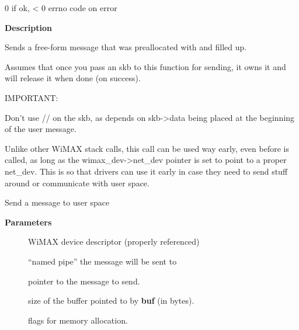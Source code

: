 \documentclass[a4paper,8pt,english]{sphinxmanual}
\begin{document}
0 if ok, \textless{} 0 errno code on error

\textbf{Description}

Sends a free-form message that was preallocated with
{\hyperref[networking/kapi:c.wimax_msg_alloc]{\emph{}}} and filled up.

Assumes that once you pass an skb to this function for sending, it
owns it and will release it when done (on success).

IMPORTANT:

Don't use {\hyperref[networking/kapi:c.skb_push]{\emph{}}}/{\hyperref[networking/kapi:c.skb_pull]{\emph{}}}/{\hyperref[networking/kapi:c.skb_reserve]{\emph{}}} on the skb, as
{\hyperref[networking/kapi:c.wimax_msg_send]{\emph{}}} depends on skb-\textgreater{}data being placed at the
beginning of the user message.

Unlike other WiMAX stack calls, this call can be used way early,
even before {\hyperref[networking/kapi:c.wimax_dev_add]{\emph{}}} is called, as long as the
wimax\_dev-\textgreater{}net\_dev pointer is set to point to a proper
net\_dev. This is so that drivers can use it early in case they need
to send stuff around or communicate with user space.

\begin{fulllineitems}
\label{networking/kapi:c.wimax_msg}
Send a message to user space

\end{fulllineitems}


\textbf{Parameters}
\begin{description}
\item[{}] \leavevmode
WiMAX device descriptor (properly referenced)

\item[{}] \leavevmode
``named pipe'' the message will be sent to

\item[{}] \leavevmode
pointer to the message to send.

\item[{}] \leavevmode
size of the buffer pointed to by \textbf{buf} (in bytes).

\item[{}] \leavevmode
flags for memory allocation.

\end{description}
\end{document}
